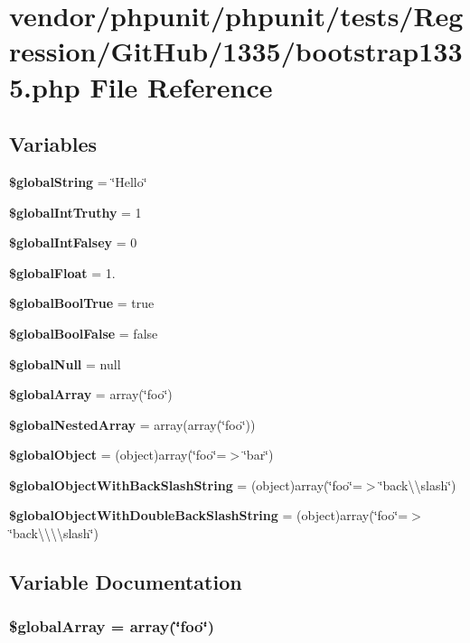 \section{vendor/phpunit/phpunit/tests/\+Regression/\+Git\+Hub/1335/bootstrap1335.php File Reference}
\label{bootstrap1335_8php}
\subsection*{Variables}
\begin{DoxyCompactItemize}
\item 
{\bf \$global\+String} = \char`\"{}Hello\char`\"{}
\item 
{\bf \$global\+Int\+Truthy} = 1
\item 
{\bf \$global\+Int\+Falsey} = 0
\item 
{\bf \$global\+Float} = 1.
\item 
{\bf \$global\+Bool\+True} = true
\item 
{\bf \$global\+Bool\+False} = false
\item 
{\bf \$global\+Null} = null
\item 
{\bf \$global\+Array} = array(\char`\"{}foo\char`\"{})
\item 
{\bf \$global\+Nested\+Array} = array(array(\char`\"{}foo\char`\"{}))
\item 
{\bf \$global\+Object} = (object)array(\char`\"{}foo\char`\"{}=$>$\char`\"{}bar\char`\"{})
\item 
{\bf \$global\+Object\+With\+Back\+Slash\+String} = (object)array(\char`\"{}foo\char`\"{}=$>$\char`\"{}back\textbackslash{}\textbackslash{}slash\char`\"{})
\item 
{\bf \$global\+Object\+With\+Double\+Back\+Slash\+String} = (object)array(\char`\"{}foo\char`\"{}=$>$\char`\"{}back\textbackslash{}\textbackslash{}\textbackslash{}\textbackslash{}slash\char`\"{})
\end{DoxyCompactItemize}


\subsection{Variable Documentation}
\subsubsection[{\$global\+Array}]{\setlength{\rightskip}{0pt plus 5cm}\$global\+Array = array(\char`\"{}foo\char`\"{})}\label{bootstrap1335_8php_ac15952f1654749e4debcbadb1976aac7}


